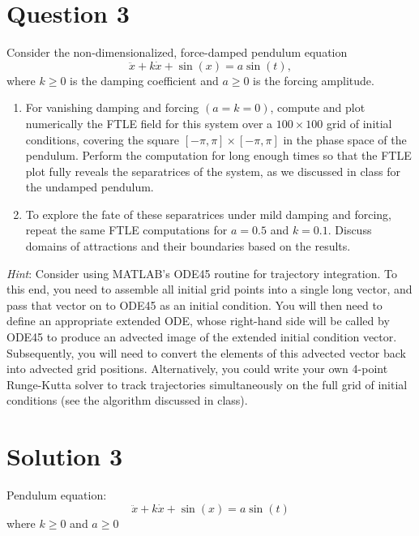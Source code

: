 \documentclass[twoside,10pt,a4paper]{article}
\begin{document}
\newpage

\section*{Question 3}
Consider the non-dimensionalized, force-damped pendulum equation
\begin{equation*}
	\ddot{x} + k\dot{x} + \sin(x) = a\sin(t),
\end{equation*}
where $k \geq 0$ is the damping coefficient and $a \geq 0$ is the forcing amplitude.

\begin{enumerate}[label=(\alph*)]
	\item For vanishing damping and forcing $(a=k=0)$, compute and plot numerically the FTLE field for this system over a $100 \times 100$ grid of initial conditions, covering the square $[- \pi, \pi] \times [-\pi, \pi]$ in the phase space of the pendulum. Perform the computation for long enough times so that the FTLE plot fully reveals the separatrices of the system, as we discussed in class for the undamped pendulum.
	\item To explore the fate of these separatrices under mild damping and forcing, repeat the same FTLE computations for $a = 0.5$ and $k = 0.1$. Discuss domains of attractions and their boundaries based on the results.
\end{enumerate}

\textit{Hint}: Consider using MATLAB’s ODE45 routine for trajectory integration. To this end, you need to assemble all initial grid points into a single long vector, and pass that vector on to ODE45 as an initial condition. You will then need to define an appropriate extended ODE, whose right-hand side will be called by ODE45 to produce an advected image of the extended initial condition vector. Subsequently, you will need to convert the elements of this advected vector back into advected grid positions.
Alternatively, you could write your own 4-point Runge-Kutta solver to track trajectories simultaneously on the full grid of initial conditions (see the algorithm discussed in class).


\section*{Solution 3}
Pendulum equation:
\begin{equation*}
	\ddot{x} + k\dot{x} + \sin(x) = a \sin(t)
\end{equation*}
where $k \geq 0$ and $a \geq 0$
\end{document}
